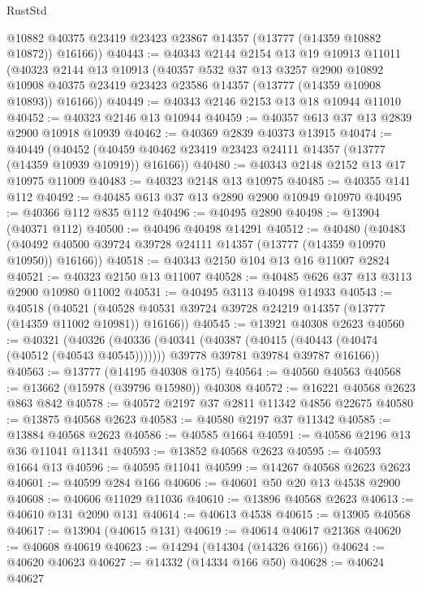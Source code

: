\begin{lexlean}{RustStd}
\begin{coremodule}
        @10882
        @40375
        @23419
        @23423
        @23867
        @14357
        (@13777 (@14359 @10882 @10872))
        @16166))
@40443 := @40343
    @2144
    @2154
    @13
    @19
    @10913
    @11011
    (@40323
      @2144
      @13
      @10913
      (@40357
        @532
        @37
        @13
        @3257
        @2900
        @10892
        @10908
        @40375
        @23419
        @23423
        @23586
        @14357
        (@13777 (@14359 @10908 @10893))
        @16166))
@40449 := @40343 @2146 @2153 @13 @18 @10944 @11010
@40452 := @40323 @2146 @13 @10944
@40459 := @40357 @613 @37 @13 @2839 @2900 @10918 @10939
@40462 := @40369 @2839 @40373 @13915
@40474 := @40449
    (@40452 (@40459 @40462 @23419 @23423 @24111 @14357 (@13777 (@14359 @10939 @10919)) @16166))
@40480 := @40343 @2148 @2152 @13 @17 @10975 @11009
@40483 := @40323 @2148 @13 @10975
@40485 := @40355 @141 @112
@40492 := @40485 @613 @37 @13 @2890 @2900 @10949 @10970
@40495 := @40366 @112 @835 @112
@40496 := @40495 @2890
@40498 := @13904 (@40371 @112)
@40500 := @40496 @40498 @14291
@40512 := @40480
    (@40483 (@40492 @40500 @39724 @39728 @24111 @14357 (@13777 (@14359 @10970 @10950)) @16166))
@40518 := @40343 @2150 @104 @13 @16 @11007 @2824
@40521 := @40323 @2150 @13 @11007
@40528 := @40485 @626 @37 @13 @3113 @2900 @10980 @11002
@40531 := @40495 @3113 @40498 @14933
@40543 := @40518
    (@40521 (@40528 @40531 @39724 @39728 @24219 @14357 (@13777 (@14359 @11002 @10981)) @16166))
@40545 := @13921 @40308 @2623
@40560 := @40321
    (@40326
      (@40336
        (@40341 (@40387 (@40415 (@40443 (@40474 (@40512 (@40543 @40545)))))))
        @39778
        @39781
        @39784
        @39787
        @16166))
@40563 := @13777 (@14195 @40308 @175)
@40564 := @40560 @40563
@40568 := @13662 (@15978 (@39796 @15980)) @40308
@40572 := @16221 @40568 @2623 @863 @842
@40578 := @40572 @2197 @37 @2811 @11342 @4856 @22675
@40580 := @13875 @40568 @2623
@40583 := @40580 @2197 @37 @11342
@40585 := @13884 @40568 @2623
@40586 := @40585 @1664
@40591 := @40586 @2196 @13 @36 @11041 @11341
@40593 := @13852 @40568 @2623
@40595 := @40593 @1664 @13
@40596 := @40595 @11041
@40599 := @14267 @40568 @2623 @2623
@40601 := @40599 @284 @166
@40606 := @40601 @50 @20 @13 @4538 @2900
@40608 := @40606 @11029 @11036
@40610 := @13896 @40568 @2623
@40613 := @40610 @131 @2090 @131
@40614 := @40613 @4538
@40615 := @13905 @40568
@40617 := @13904 (@40615 @131)
@40619 := @40614 @40617 @21368
@40620 := @40608 @40619
@40623 := @14294 (@14304 (@14326 @166))
@40624 := @40620 @40623
@40627 := @14332 (@14334 @166 @50)
@40628 := @40624 @40627

\end{coremodule}
\end{lexlean}
